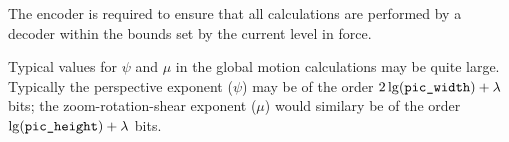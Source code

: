 The encoder is required to ensure that all calculations are performed by
a decoder within the bounds set by the current level in force.

Typical values for $\psi$ and $\mu$ in the global motion calculations
may be quite large.  Typically the perspective exponent ($\psi$) may be
of the order $2\lg(\text{\texttt{pic\_width}}) + \lambda$ bits; the zoom-rotation-shear
exponent ($\mu$) would similary be of the order $\lg(\text{\texttt{pic\_height}}) +
\lambda$ bits.
